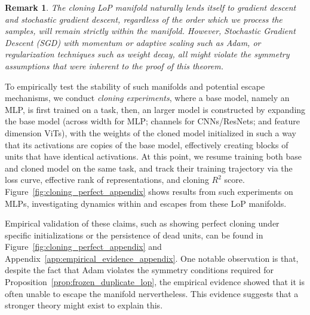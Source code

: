 \documentclass{article}
\newcommand{\GIU}[1]{\todo[color=purple!30,size=\tiny]{GIU: #1}}
\newtheorem{remark}{Remark}[section]
\numberwithin{figure}{section}
\begin{document}

\begin{remark}
The cloning LoP manifold naturally lends itself to gradient descent and stochastic gradient descent, regardless of the order which we process the samples, will remain strictly within the manifold. However, Stochastic Gradient Descent (SGD) with momentum or adaptive scaling such as Adam, or regularization techniques such as weight decay, all might violate the symmetry assumptions that were inherent to the proof of this theorem.
\end{remark}

To empirically test the stability of such manifolds and potential escape mechanisms, we conduct \emph{cloning experiments}, where a base model, namely an MLP, is first trained on a task, then, an larger model is constructed by expanding the base model (across width for MLP; channels for CNNs/ResNets; and feature dimension ViTs), with the weights of the cloned model initialized in such a way that its activations are copies of the base model, effectively creating blocks of units that have identical activations. At this point, we resume training both base and cloned model on the same task, and track their training trajectory via the loss curve, effective rank of representations, and cloning $R^2$ score. Figure~\ref{fig:cloning_perfect_appendix} shows results from such experiments on MLPs, investigating dynamics within and escapes from these LoP manifolds.

Empirical validation of these claims, such as showing perfect cloning under specific initializations  or the persistence of dead units, can be found in Figure~\ref{fig:cloning_perfect_appendix} and Appendix~\ref{app:empirical_evidence_appendix}. One notable observation is that, despite the fact that Adam violates the symmetry conditions required for Proposition~\ref{prop:frozen_duplicate_lop}, the empirical evidence showed that it is often unable to escape the manifold nervertheless. This evidence suggests that a stronger theory might exist to explain this.
\end{document}
